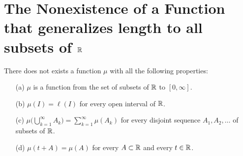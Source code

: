 \documentclass[11pt,a4paper]{book}
\begin{document}
\section{The Nonexistence of a Function that generalizes length to all subsets of \( \mathbb{R}  \)}

\begin{prop}
   There does not exists a function \( \mu  \) with all the following properties: 
   \begin{enumerate}
       \item[(a)] \( \mu  \) is a function from the set of subsets of \( \mathbb{R}  \) to \( [0,\infty ] \).
        \item[(b)] \( \mu(I) = \ell(I) \) for every open interval of \( \mathbb{R}  \).
        \item[(c)] \( \mu \Big(  \bigcup_{ k = 1  }^{ \infty  }  {A}_{k } \Big) = \sum_{ k=1  }^{ \infty  } \mu( {A}_{k })  \) for every disjoint sequence \( {A}_{1}, {A}_{2}, \dots  \) of subsets of \( \mathbb{R}  \).
        \item[(d)] \( \mu(t + A ) = \mu(A) \) for every \( A \subset \mathbb{R}  \) and every \( t \in \mathbb{R}  \).
   \end{enumerate}
\end{prop}
\end{document}
